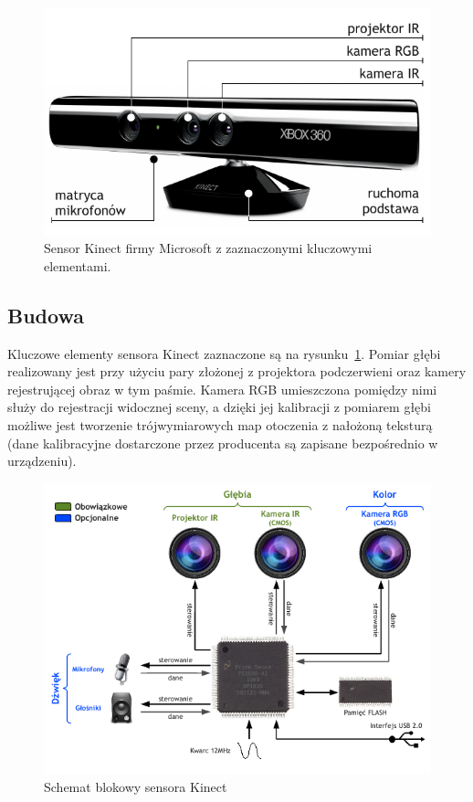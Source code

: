 \begin{figure}[h!]
\centering
\includegraphics{../img/kinect_hardware}
\caption[Sensor Kinect firmy Microsoft]{Sensor Kinect firmy Microsoft z zaznaczonymi
kluczowymi elementami.}
\label{fig:kinect_hardware}
\end{figure}

\subsection{Budowa}

Kluczowe elementy sensora Kinect zaznaczone są na rysunku~\ref{fig:kinect_hardware}.
Pomiar głębi realizowany jest przy użyciu pary złożonej z projektora podczerwieni
oraz kamery rejestrującej obraz w tym paśmie. Kamera RGB umieszczona pomiędzy nimi
służy do rejestracji widocznej sceny, a dzięki jej kalibracji z pomiarem głębi
możliwe jest tworzenie trójwymiarowych map otoczenia z nałożoną teksturą (dane
kalibracyjne dostarczone przez producenta są zapisane bezpośrednio w urządzeniu).

\begin{figure}[h!]
\centering
\includegraphics{../../Common/img/primesense}
\caption{Schemat blokowy sensora Kinect}
\label{fig:kinect_block}
\end{figure}

